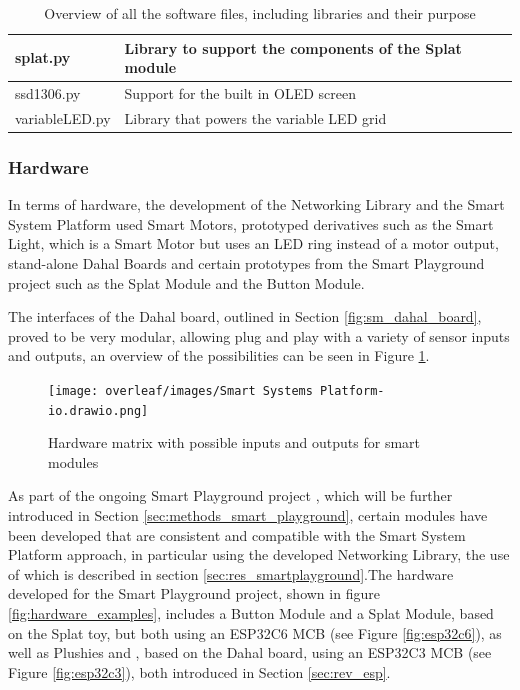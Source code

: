 \begin{table}[H]
\begin{tabular}{|l|p{180pt}|l|}
        \hline
        splat.py & Library to support the components of the Splat module & \citet{hankin_smart_nodate} \\
        \hline
        ssd1306.py & Support for the built in OLED screen & \citet{lehmann_micropython_nodate} \\
        \hline
        variableLED.py & Library that powers the variable LED grid & \citet{hankin_smart_nodate} \\
        \hline
    \end{tabular}
    \vspace{\ftspace}
    \caption{Overview of all the software files, including libraries and their purpose}
    \label{tab:software_files}
\end{table}

\subsubsection{\label{sec:methods_hw}Hardware}
In terms of hardware, the development of the Networking Library and the Smart System Platform used Smart Motors, prototyped derivatives such as the Smart Light, which is a Smart Motor but uses an LED ring instead of a motor output, stand-alone Dahal Boards and certain prototypes from the Smart Playground project such as the Splat Module and the Button Module.

The interfaces of the Dahal board, outlined in Section \ref{fig:sm_dahal_board}, proved to be very modular, allowing plug and play with a variety of sensor inputs and outputs, an overview of the possibilities can be seen in Figure \ref{fig:met_hardware}.

\begin{figure}[H]
    \centering
    \texttt{[image: overleaf/images/Smart Systems Platform-io.drawio.png]}
    \vspace{\ftspace}
    \caption{Hardware matrix with possible inputs and outputs for smart modules}
    \label{fig:met_hardware}
\end{figure}

As part of the ongoing Smart Playground project \citep{jess_smart_2025}, which will be further introduced in Section \ref{sec:methods_smart_playground}, certain modules have been developed that are consistent and compatible with the Smart System Platform approach, in particular using the developed Networking Library, the use of which is described in section \ref{sec:res_smartplayground}.The hardware developed for the Smart Playground project, shown in figure \ref{fig:hardware_examples}, includes a Button Module and a Splat Module, based on the Splat toy, but both using an ESP32C6 MCB (see Figure \ref{fig:esp32c6}), as well as Plushies and , based on the Dahal board, using an ESP32C3 MCB (see Figure \ref{fig:esp32c3}), both introduced in Section \ref{sec:rev_esp}.

